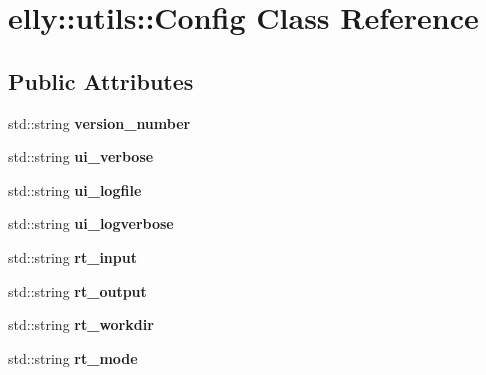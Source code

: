 \hypertarget{classelly_1_1utils_1_1_config}{\section{elly\-:\-:utils\-:\-:Config Class Reference}
\label{classelly_1_1utils_1_1_config}
}
\subsection*{Public Attributes}
\begin{DoxyCompactItemize}
\item 
\hypertarget{classelly_1_1utils_1_1_config_ac7970a34249df5f709aa8872626346fd}{std\-::string {\bfseries version\-\_\-number}}\label{classelly_1_1utils_1_1_config_ac7970a34249df5f709aa8872626346fd}

\item 
\hypertarget{classelly_1_1utils_1_1_config_a9bba2680407958c7424cef200689e717}{std\-::string {\bfseries ui\-\_\-verbose}}\label{classelly_1_1utils_1_1_config_a9bba2680407958c7424cef200689e717}

\item 
\hypertarget{classelly_1_1utils_1_1_config_a6cfe89869af3a5de3fee89de1a4cb7f2}{std\-::string {\bfseries ui\-\_\-logfile}}\label{classelly_1_1utils_1_1_config_a6cfe89869af3a5de3fee89de1a4cb7f2}

\item 
\hypertarget{classelly_1_1utils_1_1_config_a66ab256b2fa26b7a5e4de048eef769a0}{std\-::string {\bfseries ui\-\_\-logverbose}}\label{classelly_1_1utils_1_1_config_a66ab256b2fa26b7a5e4de048eef769a0}

\item 
\hypertarget{classelly_1_1utils_1_1_config_a5ccce5f23bed40102baf8487c000906f}{std\-::string {\bfseries rt\-\_\-input}}\label{classelly_1_1utils_1_1_config_a5ccce5f23bed40102baf8487c000906f}

\item 
\hypertarget{classelly_1_1utils_1_1_config_a2a52cb768a7713b84a5663f20ded975d}{std\-::string {\bfseries rt\-\_\-output}}\label{classelly_1_1utils_1_1_config_a2a52cb768a7713b84a5663f20ded975d}

\item 
\hypertarget{classelly_1_1utils_1_1_config_a7ccb3213f47bea603ee5b759b50d0e84}{std\-::string {\bfseries rt\-\_\-workdir}}\label{classelly_1_1utils_1_1_config_a7ccb3213f47bea603ee5b759b50d0e84}

\item 
\hypertarget{classelly_1_1utils_1_1_config_a26f7dbd6990842a48af30ef8be31b135}{std\-::string {\bfseries rt\-\_\-mode}}\label{classelly_1_1utils_1_1_config_a26f7dbd6990842a48af30ef8be31b135}


\end{DoxyCompactItemize}
